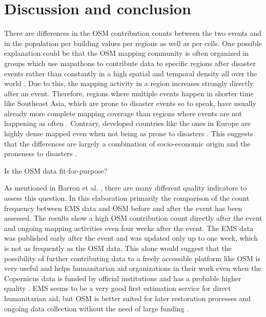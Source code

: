 \documentclass[oneside,twocolumn,10pt,cleanfoot,cleanhead]{asme2ej}
\begin{document}

\section{Discussion and conclusion}

There are differences in the OSM contribution counts between the two events and in the population per building values per regions as well as per cells.
One possible explanation could be that the OSM mapping community is often organized in groups which use mapathons to contribute data to specific regions after disaster events rather than constantly in a high spatial and temporal density all over the world \cite{YouthMappers2023, ScholzEA2018, HotOSM}.
Due to this, the mapping activity in a region increases strongly directly after an event.
Therefore, regions where multiple events happen in shorter time like Southeast Asia, which are prone to disaster events so to speak, have usually already more complete mapping coverage than regions where events are not happening as often \cite{HerfortEA2021, UNDRR2015, MinghiniEA2017}.
Contrary, developed countries like the ones in Europe are highly dense mapped even when not being as prone to disasters \cite{HerfortEA2021, GreenoughNelson2019}.
This suggests that the differences are largely a combination of socio-economic origin and the proneness to disasters \cite{HerfortEA2021}. 

Is the OSM data fit-for-purpose?

As mentioned in Barron et al. \cite{BarronEA2014}, there are many different quality indicators to assess this question.
In this elaboration primarily the comparison of the count frequency between EMS data and OSM before and after the event has been assessed.
The results show a high OSM contribution count directly after the event and ongoing mapping activities even four weeks after the event.
The EMS data was published early after the event and was updated only up to one week, which is not as frequently as the OSM data.
This alone would suggest that the possibility of further contributing data to a freely accessible platform like OSM is very useful and helps humanitarian aid organizations in their work even when the Copernicus data is funded by official institutions and has a probable higher quality \cite{HerfortEA2021, Copernicus2023}.
EMS seems to be a very good first estimation service for direct humanitarian aid, but OSM is better suited for later restoration processes and ongoing data collection without the need of large funding \cite{HerfortEA2021, MinghiniEA2017}.
\end{document}
